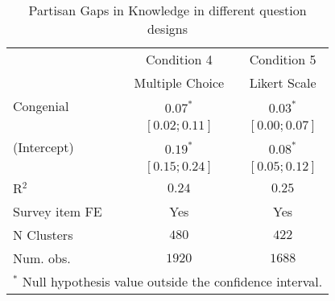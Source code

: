 \begin{table}
   \caption{Partisan Gaps in Knowledge in different question designs}
\begin{center}
 \begin{tabular}{l c c}
\hline
   & Condition 4     & Condition 5 \\
   & Multiple Choice & Likert Scale \\
\hline
Congenial      & $0.07^{*}$      & $0.03^{*}$      \\
               & $ [0.02; 0.11]$ & $ [0.00; 0.07]$ \\
(Intercept)    & $0.19^{*}$      & $0.08^{*}$      \\
               & $ [0.15; 0.24]$ & $ [0.05; 0.12]$ \\
\hline
R$^2$          & $0.24$          & $0.25$          \\
Survey item FE & Yes             & Yes             \\
N Clusters     & $480$           & $422$           \\
Num. obs.      & $1920$          & $1688$          \\
\hline
\multicolumn{3}{l}{\scriptsize{$^*$ Null hypothesis value outside the confidence interval.}}
  \end{tabular}
\end{center}
\end{table}